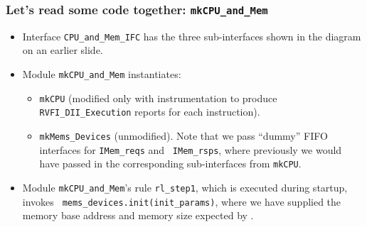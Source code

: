 
\begin{frame}[fragile]
\frametitle{Let's read some code together: {\tt mkCPU\_and\_Mem}}

\begin{center}\scriptsize

 \vspace*{5ex}
 
 \begin{minipage}{0.9\textwidth}
  \begin{itemize}

    \item Interface {\tt CPU\_and\_Mem\_IFC} has the three
          sub-interfaces shown in the diagram on an earlier slide.

    \vspace*{1ex}

    \item Module {\tt mkCPU\_and\_Mem} instantiates:
      \begin{itemize}\scriptsize

        \item {\tt mkCPU} (modified only with instrumentation to
              produce {\tt RVFI\_DII\_Execution} reports for each
              instruction).

        \item {\tt mkMems\_Devices} (unmodified). Note that we pass
              ``dummy'' FIFO interfaces for {\tt IMem\_reqs} and {\tt
              IMem\_rsps}, where previously we would have passed in
              the corresponding sub-interfaces from {\tt mkCPU}.

      \end{itemize}

    \vspace*{1ex}

    \item Module {\tt mkCPU\_and\_Mem}'s rule {\tt rl\_step1}, which
      is executed during startup, invokes {\tt
      mems\_devices.init(init\_params)}, where we have supplied the
      memory base address and memory size expected by {\TESTRIG}.


\end{itemize}
\end{minipage}
\end{center}
\end{frame}
